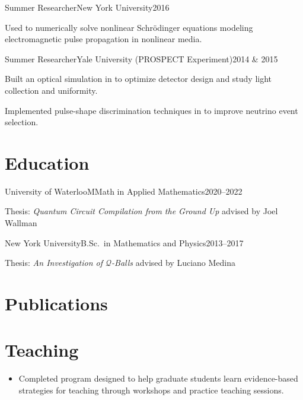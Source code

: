 \documentclass{cultvoucher}
\begin{document}
\begin{entry}{Summer Researcher}{New York University}{2016}
	\item Used  to numerically solve nonlinear Schr\"{o}dinger equations modeling electromagnetic pulse propagation in nonlinear media.
\end{entry}

\begin{entry}{Summer Researcher}{Yale University (PROSPECT Experiment)}{2014 \& 2015}
    \item Built an optical simulation in  to optimize detector design and study light collection and uniformity.
    \item Implemented pulse-shape discrimination techniques in  to improve neutrino event selection.
\end{entry}

\section{Education}

\begin{entry}{University of Waterloo}{MMath in Applied Mathematics}{2020--2022}
	\item Thesis: \textit{Quantum Circuit Compilation from the Ground Up} advised by Joel Wallman
\end{entry}

\begin{entry}{New York University}{B.Sc.\ in Mathematics and Physics}{2013--2017}
	\item Thesis: \textit{An Investigation of $\mathcal{Q}$-Balls} advised by Luciano Medina
\end{entry}

\section{Publications} %

\section{Teaching}

\begin{itemize}
	\item Completed program designed to help graduate students learn evidence-based strategies for teaching through workshops and practice teaching sessions.
\end{itemize}
\end{document}

